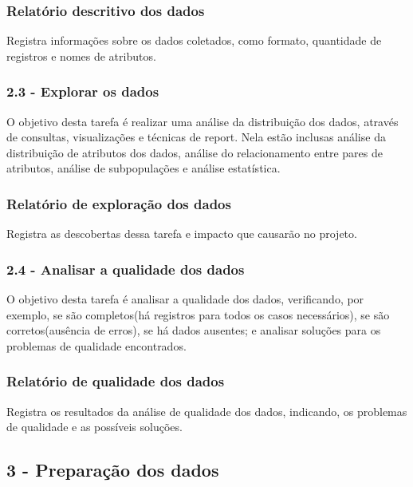 \subsubsection*{Relatório descritivo dos dados}

Registra informações sobre os dados coletados, como formato, quantidade de registros e nomes de atributos.

\subsubsection*{\textbf{2.3 - Explorar os dados}}

O objetivo desta tarefa é realizar uma análise da distribuição dos dados, através de consultas, visualizações e técnicas de report. Nela estão inclusas análise da distribuição de atributos dos dados, análise do relacionamento entre pares de atributos, análise de subpopulações e análise estatística. 

\subsubsection*{Relatório de exploração dos dados}

Registra as descobertas dessa tarefa e impacto que causarão no projeto.

\subsubsection*{\textbf{2.4 - Analisar a qualidade dos dados}}

O objetivo desta tarefa é analisar a qualidade dos dados, verificando, por exemplo, se são completos(há registros para todos os casos necessários), se são corretos(ausência de erros), se há dados ausentes; e analisar soluções para os problemas de qualidade encontrados.

\subsubsection*{Relatório de qualidade dos dados}

Registra os resultados da análise de qualidade dos dados, indicando, os problemas de qualidade e as possíveis soluções.

\newpage

\subsection*{3 - Preparação dos dados}

